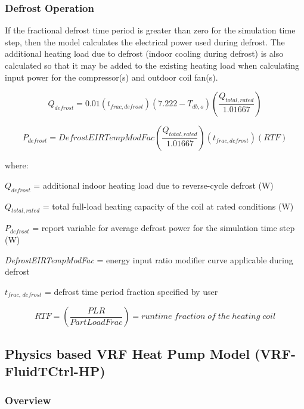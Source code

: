\subsubsection{Defrost Operation}\label{defrost-operation-201605050925}

If the fractional defrost time period is greater than zero for the simulation time step, then the model calculates the electrical power used during defrost. The additional heating load due to defrost (indoor cooling during defrost) is also calculated so that it may be added to the existing heating load when calculating input power for the compressor(s) and outdoor coil fan(s).

\begin{equation}
  Q_{defrost} = 0.01 \left( t_{frac,defrost} \right) \left( 7.222 - T_{db,o} \right) \left( \frac{Q_{total,rated}}{1.01667} \right)
\end{equation}

\begin{equation}
  P_{defrost} = DefrostEIRTempModFac \left( \frac{Q_{total,rated}}{1.01667} \right) \left( t_{frac,defrost} \right) \left( RTF \right)
\end{equation}

where:

\(Q_{defrost}\) = additional indoor heating load due to reverse-cycle defrost (W)

\(Q_{total,rated}\) = total full-load heating capacity of the coil at rated conditions (W)

\(P_{defrost}\) = report variable for average defrost power for the simulation time step (W)

\emph{DefrostEIRTempModFac} = energy input ratio modifier curve applicable during defrost

\(t_{frac,\,defrost}\) = defrost time period fraction specified by user

\begin{equation}
  RTF = \left(  \frac{PLR}{PartLoadFrac} \right) = runtime\;fraction\;of\;the\;heating\;coil
\end{equation}

\subsection{Physics based VRF Heat Pump Model (VRF-FluidTCtrl-HP)}\label{VRF-FluidTCtrl-HP}

\subsubsection{Overview}\label{VRF-FluidTCtrl-HP-overview}

